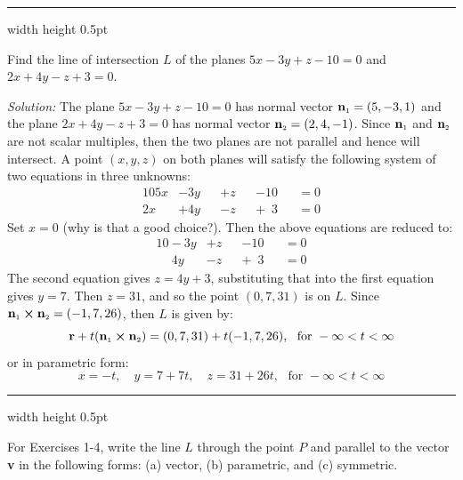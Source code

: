 \vspace{4mm}
\hrule width \textwidth height 0.5pt
\begin{exmp}\label{exmp:planeinter}
 Find the line of intersection $L$ of the planes $5x - 3y + z - 10 = 0$ and $2x + 4y - z + 3 = 0$.\vspace{1mm}
 \par\noindent\emph{Solution:} The plane $5x - 3y + z - 10 = 0$ has normal vector $\textbf{n}_{\scriptscriptstyle 1} = (5,-3,1)$ and
 the plane $2x + 4y - z + 3 = 0$ has normal vector $\textbf{n}_{\scriptscriptstyle 2} = (2,4,-1)$. Since $\textbf{n}_{\scriptscriptstyle 1}$ and
 $\textbf{n}_{\scriptscriptstyle 2}$ are not scalar multiples, then the two planes are not parallel and hence will intersect. A
 point $(x,y,z)$ on both planes will satisfy the following system of two equations in three unknowns:
 \begin{alignat*}{10}
  5x &- 3y &&+ z &&- 10 &&= 0\\
  2x &+ 4y &&- z &&+ \phantom{1}3 &&= 0
 \end{alignat*}
 Set $x = 0$ (why is that a good choice?). Then the above equations are reduced to:
 \begin{alignat*}{10}
  -3y &+ z &&- 10 &&= 0\\
  \phantom{-}4y &- z &&+ \phantom{1}3 &&= 0
 \end{alignat*}
 The second equation gives $z = 4y + 3$, substituting that into the first equation gives $y = 7$. Then $z = 31$,
 and so the point $(0,7,31)$ is on $L$. Since $\textbf{n}_{\scriptscriptstyle 1} \bm{\times} \textbf{n}_{\scriptscriptstyle 2} = (-1,7,26)$,
 then $L$ is given by:
 \begin{displaymath}
  \textbf{r} + t(\textbf{n}_{\scriptscriptstyle 1} \bm{\times} \textbf{n}_{\scriptscriptstyle 2}) = (0,7,31) + t(-1,7,26), \text{~~for~}
  -\infty < t < \infty
 \end{displaymath}
 or in parametric form:
 \begin{displaymath}
  x = -t, \quad y = 7 + 7t, \quad z = 31 +26t, \text{~~for~} -\infty < t < \infty
 \end{displaymath} 
\end{exmp}
\hrule width \textwidth height 0.5pt
\newpage
\centerline{}\label{sec1dot5}
\par\noindent For Exercises 1-4, write the line $L$ through the point $P$ and parallel to the vector \textbf{v} in the
 following forms: (a) vector, (b) parametric, and (c) symmetric.
